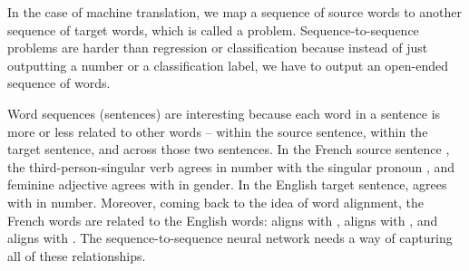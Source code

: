 

In the case of machine translation, we map a sequence of source words to another sequence of target words, which is called a  problem.  Sequence-to-sequence problems are harder than regression or classification because instead of just outputting a number or a classification label, we have to output an open-ended sequence of words.

Word sequences (sentences) are interesting because each word in a sentence is more or less related to other words -- within the source sentence, within the target sentence, and across those two sentences.  In the French source sentence , the third-person-singular verb  agrees in number with the singular pronoun , and feminine adjective  agrees with  in gender.  In the English target sentence,  agrees with  in number.  Moreover, coming back to the idea of word alignment, the French words are related to the English words:  aligns with ,  aligns with , and  aligns with .  The sequence-to-sequence neural network needs a way of capturing all of these relationships.  

